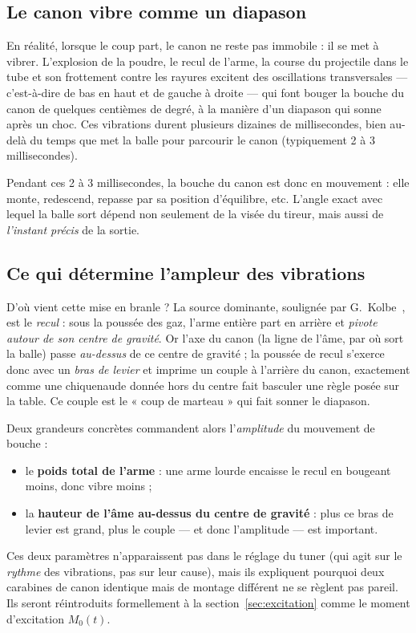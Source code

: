 \documentclass[12pt,a4paper]{article}
\begin{document}
	\subsection{Le canon vibre comme un diapason}

	En réalité, lorsque le coup part, le canon ne reste pas immobile : il se met à vibrer. L'explosion de la poudre, le recul de l'arme, la course du projectile dans le tube et son frottement contre les rayures excitent des oscillations transversales — c'est-à-dire de bas en haut et de gauche à droite — qui font bouger la bouche du canon de quelques centièmes de degré, à la manière d'un diapason qui sonne après un choc. Ces vibrations durent plusieurs dizaines de millisecondes, bien au-delà du temps que met la balle pour parcourir le canon (typiquement 2 à 3 millisecondes).

	Pendant ces 2 à 3 millisecondes, la bouche du canon est donc en mouvement : elle monte, redescend, repasse par sa position d'équilibre, etc. L'angle exact avec lequel la balle sort dépend non seulement de la visée du tireur, mais aussi de \emph{l'instant précis} de la sortie.

	\subsection{Ce qui détermine l'ampleur des vibrations}

	D'où vient cette mise en branle ? La source dominante, soulignée par G.\ Kolbe~\cite{KolbeSim}, est le \emph{recul} : sous la poussée des gaz, l'arme entière part en arrière et \emph{pivote autour de son centre de gravité}. Or l'axe du canon (la ligne de l'âme, par où sort la balle) passe \emph{au-dessus} de ce centre de gravité ; la poussée de recul s'exerce donc avec un \emph{bras de levier} et imprime un couple à l'arrière du canon, exactement comme une chiquenaude donnée hors du centre fait basculer une règle posée sur la table. Ce couple est le « coup de marteau » qui fait sonner le diapason.

	Deux grandeurs concrètes commandent alors l'\emph{amplitude} du mouvement de bouche :
	\begin{itemize}
		\item le \textbf{poids total de l'arme} : une arme lourde encaisse le recul en bougeant moins, donc vibre moins ;
		\item la \textbf{hauteur de l'âme au-dessus du centre de gravité} : plus ce bras de levier est grand, plus le couple — et donc l'amplitude — est important.
	\end{itemize}
	Ces deux paramètres n'apparaissent pas dans le réglage du tuner (qui agit sur le \emph{rythme} des vibrations, pas sur leur cause), mais ils expliquent pourquoi deux carabines de canon identique mais de montage différent ne se règlent pas pareil. Ils seront réintroduits formellement à la section~\ref{sec:excitation} comme le moment d'excitation $M_0(t)$.
\end{document}
